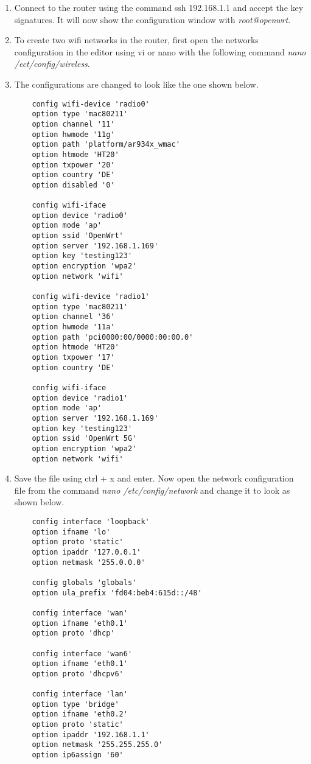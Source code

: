 \begin{enumerate}
	\item Connect to the router using the command ssh 192.168.1.1 and accept the key signatures. It will now show the configuration window with \textit{root@openwrt}.
	\item To create two wifi networks in the router, first open the networks configuration in the editor using vi or nano with the following command \textit{nano /ect/config/wireless}.
	\item The configurations are changed to look like the one shown below.
	\begin{lstlisting}
	config wifi-device 'radio0'
	option type 'mac80211'
	option channel '11'
	option hwmode '11g'
	option path 'platform/ar934x_wmac'
	option htmode 'HT20'
	option txpower '20'
	option country 'DE'
	option disabled '0'
	
	config wifi-iface
	option device 'radio0'
	option mode 'ap'
	option ssid 'OpenWrt'
	option server '192.168.1.169'
	option key 'testing123'
	option encryption 'wpa2'
	option network 'wifi'
	
	config wifi-device 'radio1'
	option type 'mac80211'
	option channel '36'
	option hwmode '11a'
	option path 'pci0000:00/0000:00:00.0'
	option htmode 'HT20'
	option txpower '17'
	option country 'DE'
	
	config wifi-iface
	option device 'radio1'
	option mode 'ap'
	option server '192.168.1.169'
	option key 'testing123'
	option ssid 'OpenWrt 5G'
	option encryption 'wpa2'
	option network 'wifi'
	\end{lstlisting}
	\item Save the file using ctrl + x and enter. Now open the network configuration file from the command \textit{nano /etc/config/network} and change it to look as shown below.
	\begin{lstlisting}
	config interface 'loopback'
	option ifname 'lo'
	option proto 'static'
	option ipaddr '127.0.0.1'
	option netmask '255.0.0.0'
	
	config globals 'globals'
	option ula_prefix 'fd04:beb4:615d::/48'
	
	config interface 'wan'
	option ifname 'eth0.1'
	option proto 'dhcp'
	
	config interface 'wan6'
	option ifname 'eth0.1'
	option proto 'dhcpv6'
	
	config interface 'lan'
	option type 'bridge'
	option ifname 'eth0.2'
	option proto 'static'
	option ipaddr '192.168.1.1'
	option netmask '255.255.255.0'
	option ip6assign '60'
	

\end{lstlisting}
\end{enumerate}
